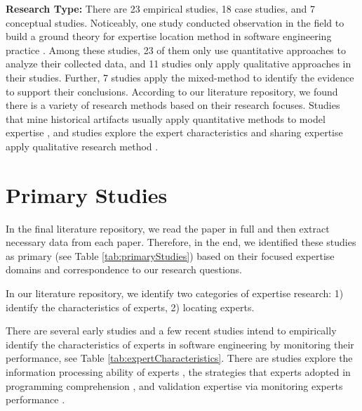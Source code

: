 \textbf{Research Type:} There are 23 empirical studies, 18 case studies, and 7 conceptual studies. Noticeably, one study conducted observation in the field to build a ground theory for expertise location method in software engineering practice \cite{mcdonald1998just}. Among these studies, 23 of them only use quantitative approaches to analyze their collected data, and 11 studies only apply qualitative approaches in their studies. Further, 7 studies apply the mixed-method to identify the evidence to support their conclusions. According to our literature repository, we found there is a variety of research methods based on their research focuses. Studies that mine historical artifacts usually apply quantitative methods to model expertise \cite{Anvik2006who, minto2007recommending, mockus2002expertise, vasilescu2014social}, and studies explore the expert characteristics and sharing expertise apply qualitative research method \cite{chen2016towards, koenemann1991expert, ley2014information, waterson1997dynamics}.

\section{Primary Studies}

In the final literature repository, we read the paper in full and then extract necessary data from each paper. Therefore, in the end, we identified these studies as primary (see Table \ref{tab:primaryStudies}) based on their focused expertise domains and correspondence to our research questions.



In our literature repository, we identify two categories of expertise research: 1) identify the characteristics of experts, 2) locating experts.



There are several early studies and a few recent studies intend to empirically identify the characteristics of experts in software engineering by monitoring their performance, see Table \ref{tab:expertCharacteristics}. There are studies explore the information processing ability of experts \cite{MCKEITHEN1981307}, the strategies that experts adopted in programming comprehension \cite{koenemann1991expert}, and validation expertise via monitoring experts performance \cite{davies1994knowledge, bergersen2014construction}.

